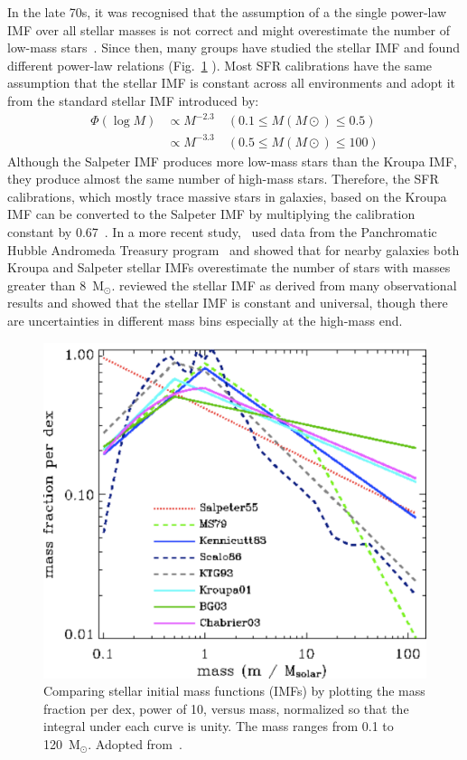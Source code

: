 In the late 70s, it was recognised that the assumption of a the single power-law IMF over all stellar masses is not correct and might overestimate the number of low-mass stars~\citep{Kroupa93, Bastin10}. 
Since then, many groups have studied the stellar IMF and found different power-law relations (Fig.~\ref{fig: imf} ). 
Most SFR calibrations have the same assumption that the stellar IMF is constant across all environments and adopt it from the standard stellar IMF introduced by\cite{Kroupa01}:
\begin{equation}
\begin{split}
    \Phi (\log M) & \propto M^{-2.3}    \quad    (0.1 \le M(M{\odot}) \le 0.5)\\                  
           & \propto M^{-3.3}    \quad    (0.5 \le M(M{\odot}) \le 100)
\end{split}
\end{equation}
Although the Salpeter IMF produces more low-mass stars than the Kroupa IMF, they produce almost the same number of high-mass stars. 
Therefore, the SFR calibrations, which mostly trace massive stars in galaxies, based on the Kroupa IMF can be converted to the Salpeter IMF by multiplying the calibration constant by 0.67~\citep{Madau14}.
In a more recent study,~\cite{Weisz15} used data from the Panchromatic Hubble Andromeda Treasury program~\citep[PHAT][]{Dalcanton12} and showed that for nearby galaxies both Kroupa and Salpeter stellar IMFs overestimate the number of stars with masses greater than 8~M$_\odot$.
\cite{Bastin10} reviewed the stellar IMF as derived from many observational results and showed that the stellar IMF is constant and universal, though there are uncertainties in different mass bins especially at the high-mass end. 

\begin{figure}
\label{fig: imf}
\centering
\includegraphics[width=16cm]{../image_intro/imf}
\small
\caption{Comparing stellar initial mass functions (IMFs) by plotting the mass fraction per dex, power of 10, versus mass, normalized so that the integral under each curve is unity. The mass ranges from 0.1 to 120~M$_\odot$. Adopted from~\cite{Baldry03}.} 
\end{figure}


